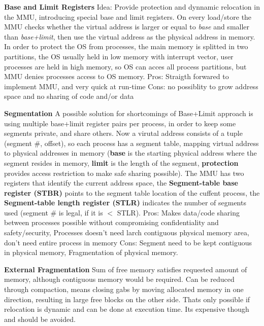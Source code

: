 \documentclass[11pt,a4paper]{article}
\begin{document}
	\textbf{Base and Limit Registers} \newline
	Idea: Provide protection and dynnamic relocation in the MMU, introducing special base and limit registers. On every load/store the MMU checks whether the virtual address is larger or equal to \textit{base} and smaller than \textit{base+limit}, then use the virtual address as the physical address in memory. \newline
	In order to protect the OS from processes, the main memory is splitted in two partitions, the OS usually held in low memory with interrupt vector, user processes are held in high memory, so OS can acces all process partitions, but MMU denies processes access to OS memory.\newline
	Pros: Straigth forwared to implement MMU, and very quick at run-time \newline
	Cons: no possiblity to grow address space and no sharing of code and/or data \newline
	
	\textbf{Segmentation} \newline
	A possible solution for shortcomings of Base+Limit approach is using multiple base+limit register pairs per process, in order to keep some segments private, and share others. \newline
	Now a virutal address consists of a tuple (segment \#, offset), so each process has a segment table, mapping virtual address to physical addresses in memory (\textbf{base} is the starting physical address where the segment resides in memory, \textbf{limit} is the length of the segment, \textbf{protection} provides access restriction to make safe sharing possible). The MMU has two registers that identify the current address space, the \textbf{Segment-table base register (STBR)} points to the segment table location of the cuffent process, the \textbf{Segment-table length register (STLR)} indicates the number of segments used (segment \# is legal, if it is $<$ STLR). \newline
	Pros: Makes data/code sharing between processes possible without compromising confidentiality and safety/security, Processes doesn't need larch contiguous physical memory area, don't need entire process in memory \newline
	Cons: Segment need to be kept contiguous in physical memory, Fragmentation of physical memory. \newline
	
	\textbf{External Fragmentation} \newline
	Sum of free memory satisfies requested amount of memory, although contiguous memory would be required. Can be reduced through compaction, means closing gabs by moving allocated memory in one direction, resulting in large free blocks on the other side. Thats only possible if relocation is dynamic and can be done at execution time. Its expensive though and should be avoided. \newline
	
\end{document}
